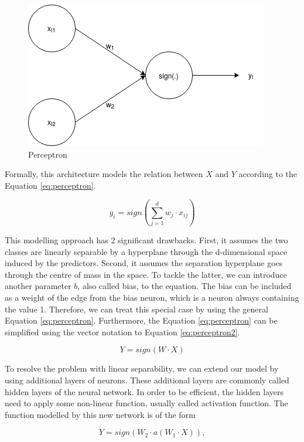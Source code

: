 \begin{figure}
    \centering
    \includegraphics[width=0.5\linewidth]{imgs_andy/perceptron.png}
    \caption{Perceptron}
    \label{fig:perceptron}
\end{figure}

Formally, this architecture models the relation between $X$ and $Y$ according to the Equation \ref{eq:perceptron}. 

\begin{equation}
    y_i = sign(\sum_{j=1}^{d} w_j \cdot x_{ij}) 
    \label{eq:perceptron}
\end{equation}

This modelling approach has 2 significant drawbacks.
First, it assumes the two classes are linearly separable by a hyperplane through the d-dimensional space induced by the predictors.
Second, it assumes the separation hyperplane goes through the centre of mass in the space.
To tackle the latter, we can introduce another parameter $b$, also called bias, to the equation.
The bias can be included as a weight of the edge from the bias neuron, which is a neuron always containing the value 1.
Therefore, we can treat this special case by using the general Equation \ref{eq:perceptron}.
Furthermore, the Equation \ref{eq:perceptron} can be simplified using the vector notation to Equation \ref{eq:perceptron2}.

\begin{equation}
    Y = sign(W \cdot X)
    \label{eq:perceptron2}
\end{equation}

To resolve the problem with linear separability, we can extend our model by using additional layers of neurons.
These additional layers are commonly called hidden layers of the neural network.
In order to be efficient, the hidden layers need to apply some non-linear function, usually called activation function.
The function modelled by this new network is of the form

\begin{equation}
    Y = sign(W_2 \cdot a(W_1 \cdot X)),
    \label{eq:perceptron3}
\end{equation}

